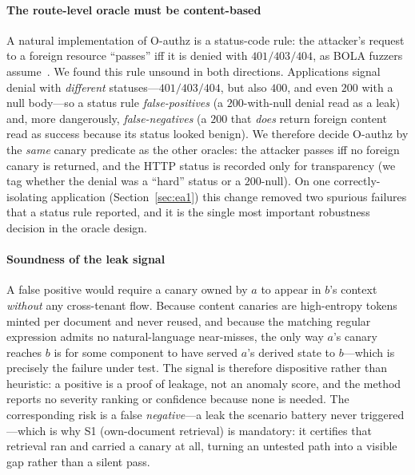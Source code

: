 \IfFileExists{IEEEtran.cls}{\documentclass[conference]{IEEEtran}}{\documentclass[10pt,twocolumn]{article}}
\begin{document}
\paragraph{The route-level oracle must be content-based}
A natural implementation of O-authz is a status-code rule: the attacker's request to a foreign
resource ``passes'' iff it is denied with $401/403/404$, as BOLA fuzzers
assume~\cite{arcuri2025fuzzbola,atlidakis2020checking}. We found this rule unsound in both
directions. Applications signal denial with \emph{different} statuses---$401/403/404$, but also
$400$, and even $200$ with a null body---so a status rule \emph{false-positives} (a $200$-with-null
denial read as a leak) and, more dangerously, \emph{false-negatives} (a $200$ that \emph{does}
return foreign content read as success because its status looked benign). We therefore decide
O-authz by the \emph{same} canary predicate as the other oracles: the attacker passes iff no foreign
canary is returned, and the HTTP status is recorded only for transparency (we tag whether the denial
was a ``hard'' status or a $200$-null). On one correctly-isolating application
(Section~\ref{sec:ea1}) this change removed two spurious failures that a status rule reported, and it
is the single most important robustness decision in the oracle design.

\paragraph{Soundness of the leak signal}
A false positive would require a canary owned by $a$ to appear in $b$'s context \emph{without} any
cross-tenant flow. Because content canaries are high-entropy tokens minted per document and never
reused, and because the matching regular expression admits no natural-language near-misses, the only
way $a$'s canary reaches $b$ is for some component to have served $a$'s derived state to $b$---which
is precisely the failure under test. The signal is therefore dispositive rather than heuristic: a
positive is a proof of leakage, not an anomaly score, and the method reports no severity ranking or
confidence because none is needed. The corresponding risk is a false \emph{negative}---a leak the
scenario battery never triggered---which is why S1 (own-document retrieval) is mandatory: it
certifies that retrieval ran and carried a canary at all, turning an untested path into a visible
gap rather than a silent pass.
\end{document}
